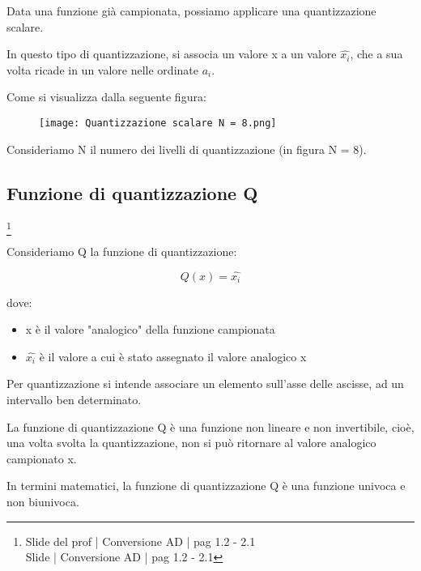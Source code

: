 Data una funzione già campionata, possiamo applicare una quantizzazione scalare. \newline 

In questo tipo di quantizzazione, si associa un valore x a un valore $\hat{x_i}$, che a sua volta ricade in un valore nelle ordinate $a_i$. \newline 

Come si visualizza dalla seguente figura: 

\begin{figure}[h]
    \centering
    \texttt{[image: Quantizzazione scalare N = 8.png]}
\end{figure} 

Consideriamo N il numero dei livelli di quantizzazione (in figura N = 8). \newline 

\newpage 

\subsection{Funzione di quantizzazione Q}
\footnote{Slide del prof | Conversione AD | pag 1.2 - 2.1 \\  
Slide | Conversione AD | pag 1.2 - 2.1 
}

Consideriamo Q la funzione di quantizzazione: 

{
    \Large 
    \begin{equation}
        Q(x) = \hat{x_i}
    \end{equation}
}

dove: 

\begin{itemize}
    \item x è il valore "analogico" della funzione campionata 
    \item $\hat{x_i}$ è il valore a cui è stato assegnato il valore analogico x
\end{itemize}

Per quantizzazione si intende associare un elemento sull'asse delle ascisse, 
ad un intervallo ben determinato. \newline 

La funzione di quantizzazione Q è una funzione non lineare e non invertibile, cioè, una volta svolta la quantizzazione, 
non si può ritornare al valore analogico campionato x. \newline 

In termini matematici, 
la funzione di quantizzazione Q è una funzione univoca e non biunivoca. \newline 

